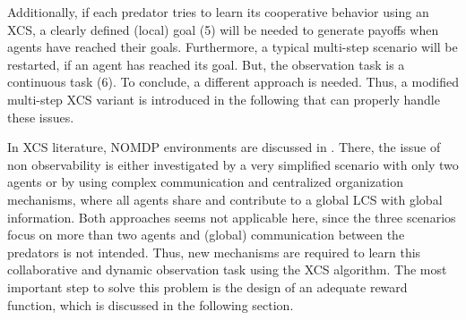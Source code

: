 Additionally, if each predator tries to learn its cooperative behavior using an XCS, a clearly defined (local) goal (5) will be needed to generate payoffs when agents have reached their goals. Furthermore, a typical multi-step scenario will be restarted, if an agent has reached its goal. But, the observation task is a continuous task (6). %
To conclude, a different approach is needed. Thus, a modified multi-step XCS variant is introduced in the following that can properly handle these issues.

In XCS literature, NOMDP environments are discussed in \cite{Miyazaki2,TTS01}. There, the issue of non observability is either investigated by a very simplified scenario with only two agents or by using complex communication and centralized organization mechanisms, where all agents share and contribute to a global LCS with global information. Both approaches seems not applicable here, since the three scenarios focus on more than two agents and (global) communication between the predators is not intended. Thus, new mechanisms are required to learn this %
collaborative and dynamic observation task using the XCS algorithm. The most important step to solve this problem is the design of an adequate reward function, which is discussed in the following section.
